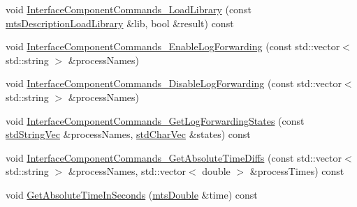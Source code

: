 \begin{DoxyCompactItemize}
\item 
void \hyperlink{classmts_manager_component_client_a57f8645c0a6863afe5de2015663ed56e}{Interface\-Component\-Commands\-\_\-\-Load\-Library} (const \hyperlink{classmts_description_load_library}{mts\-Description\-Load\-Library} \&lib, bool \&result) const 
\item 
void \hyperlink{classmts_manager_component_client_a0f18b0ca5e0033d8b79d3c122cabfc34}{Interface\-Component\-Commands\-\_\-\-Enable\-Log\-Forwarding} (const std\-::vector$<$ std\-::string $>$ \&process\-Names)
\item 
void \hyperlink{classmts_manager_component_client_ae1414f75a81804aef52ebb98fd57ffb4}{Interface\-Component\-Commands\-\_\-\-Disable\-Log\-Forwarding} (const std\-::vector$<$ std\-::string $>$ \&process\-Names)
\item 
void \hyperlink{classmts_manager_component_client_ae2718770ec2d7fe575827ef2fe3021d9}{Interface\-Component\-Commands\-\_\-\-Get\-Log\-Forwarding\-States} (const \hyperlink{mts_generic_object_proxy_8h_ae2238149254430b4959aa4e16892fc07}{std\-String\-Vec} \&process\-Names, \hyperlink{mts_generic_object_proxy_8h_a3fcb43cabc338a5aee6772138bee2416}{std\-Char\-Vec} \&states) const 
\item 
void \hyperlink{classmts_manager_component_client_ae7eea9db98c4c4075089dd526f632c02}{Interface\-Component\-Commands\-\_\-\-Get\-Absolute\-Time\-Diffs} (const std\-::vector$<$ std\-::string $>$ \&process\-Names, std\-::vector$<$ double $>$ \&process\-Times) const 
\item 
void \hyperlink{classmts_manager_component_client_a28c83b829432326cc4fe6bcd340a7b17}{Get\-Absolute\-Time\-In\-Seconds} (\hyperlink{mts_generic_object_proxy_8h_a31e76b0190a8d3f9838626cd7b47bd75}{mts\-Double} \&time) const 
\end{DoxyCompactItemize}

